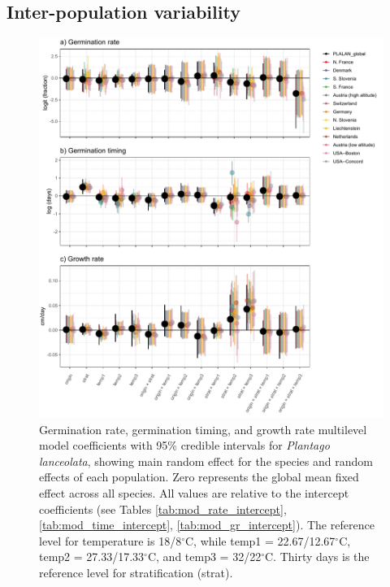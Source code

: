 \documentclass[12pt]{article}\usepackage[]{graphicx}\usepackage[]{color}
\begin{document}
\subsection{Inter-population variability}
\pagebreak
\begin{figure}[H]
\centering
\includegraphics[scale=1]{PLALAN_pops_plot.pdf}
\caption{Germination rate, germination timing, and growth rate multilevel model coefficients with 95\% credible intervals for \textit{Plantago lanceolata}, showing main random effect for the species and random effects of each population. Zero represents the global mean fixed effect across all species. All values are relative to the intercept coefficients (see Tables \ref{tab:mod_rate_intercept}, \ref{tab:mod_time_intercept}, \ref{tab:mod_gr_intercept}). The reference level for temperature is 18/8$^\circ$C, while temp1 = 22.67/12.67$^\circ$C, temp2 = 27.33/17.33$^\circ$C, and temp3 = 32/22$^\circ$C. Thirty days is the reference level for stratification (strat).}
\label{fig:pops}
\end{figure}
\end{document}
